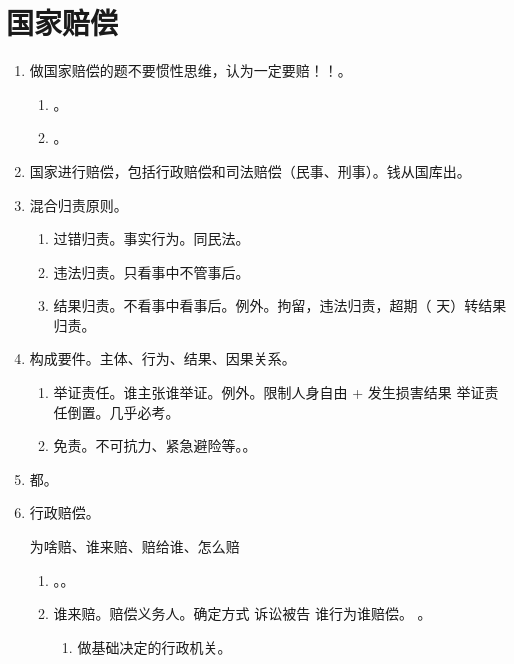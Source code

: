 \section{国家赔偿}
\begin{enumerate}
  \item 做国家赔偿的题不要惯性思维，认为一定要赔！！。
        \begin{enumerate}
          \item {}。
          \item {}。
        \end{enumerate}
  \item 国家进行赔偿，包括行政赔偿和司法赔偿（民事、刑事）。钱从国库出。
  \item 混合归责原则。
        \begin{enumerate}
          \item 过错归责。事实行为。同民法。
          \item 违法归责。只看事中不管事后。
          \item 结果归责。不看事中看事后。例外。拘留，违法归责，超期（ 天）转结果归责。
        \end{enumerate}
  \item 构成要件。主体、行为、结果、因果关系。
        \begin{enumerate}
          \item 举证责任。谁主张谁举证。例外。限制人身自由 + 发生损害结果 \yjt 举证责任倒置。几乎必考。
          \item 免责。不可抗力、紧急避险等。。
        \end{enumerate}
  \item 都。
  \item 行政赔偿。
        \begin{kk}{为啥赔、谁来赔、赔给谁、怎么赔}
          \begin{enumerate}
            \item {}。。
            \item 谁来赔。赔偿义务人。确定方式 \ydy 诉讼被告 \yjt 谁行为谁赔偿。
                  。
                  \begin{enumerate}
                    \item 做基础决定的行政机关。

\end{enumerate}
\end{enumerate}
\end{kk}
\end{enumerate}

